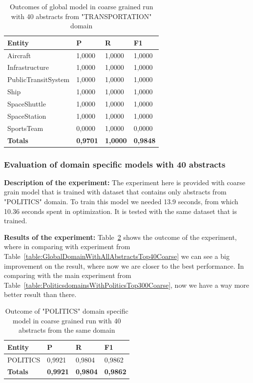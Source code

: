 \documentclass[thesis=M,english]{FITthesis}[2018/05/30]
\begin{document}
	\begin{table}[H]\centering
		\begin{tabular}{|l|l|l|l|}
			\hline {\textbf{Entity}} & {\textbf{P}} & {\textbf{R}} & {\textbf{F1}}\\\hline
				Aircraft & 1,0000 & 1,0000 & 1,0000\\
				Infrastructure & 1,0000 & 1,0000 & 1,0000\\
				PublicTransitSystem & 1,0000 & 1,0000 & 1,0000\\
				Ship & 1,0000 & 1,0000 & 1,0000\\				
				SpaceShuttle & 1,0000 & 1,0000 & 1,0000\\
				SpaceStation & 1,0000 & 1,0000 & 1,0000\\
				SportsTeam & 0,0000 & 1,0000 & 0,0000\\\hline
				\textbf{Totals} & \textbf{0,9701} & \textbf{1,0000} & \textbf{0,9848}\\\hline
		\end{tabular}
		\caption{Outcomes of global model in coarse grained run with 40 abstracts from "TRANSPORTATION" domain \label{table:GlobalDomainWithTransportationTop40Fine}}
	\end{table}	
	
	
\subsubsection{Evaluation of domain specific models with 40 abstracts}

	\textbf{Description of the experiment:} The experiment here is provided with coarse grain model that is trained with dataset that contains only abstracts from "POLITICS" domain. To train this model we needed 13.9 seconds, from which 10.36 seconds spent in optimization. It is tested with the same dataset that is trained.

	\textbf{Results of the experiment:} Table~\ref{table:PoliticsDomainWithPoliticsTop40Coarse} shows the outcome of the experiment, where in comparing with experiment from Table~\ref{table:GlobalDomainWithAllAbstractsTop40Coarse} we can see a big improvement on the result, where now we are closer to the best performance. In comparing with the main experiment from Table~\ref{table:PoliticsdomainsWithPoliticsTop300Coarse}, now we have a way more better result than there.

	\begin{table}[H]\centering
		\begin{tabular}{|l|l|l|l|}
			\hline {\textbf{Entity}} & {\textbf{P}} & {\textbf{R}} & {\textbf{F1}}\\\hline
				POLITICS & 0,9921 & 0,9804 & 0,9862\\\hline
				\textbf{Totals} & \textbf{0,9921} & \textbf{0,9804} & \textbf{0,9862}\\\hline
		\end{tabular}
		\caption{Outcome of "POLITICS" domain specific model in coarse grained run with 40 abstracts from the same domain \label{table:PoliticsDomainWithPoliticsTop40Coarse}}	
	\end{table}
\end{document}

